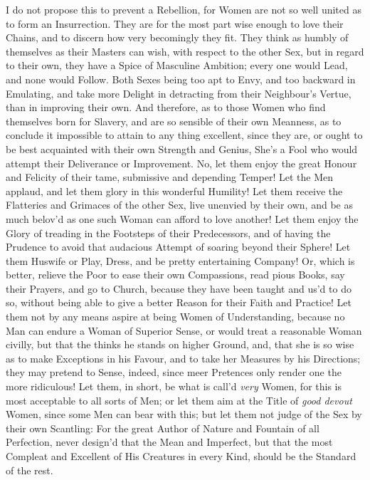 I do not propose this to prevent a Rebellion, for Women are not so
well united as to form an Insurrection. They are for the most part
wise enough to love their Chains, and to discern how very becomingly
they fit. They think as humbly of themselves as their Masters can
wish, with respect to the other Sex, but in regard to their own, they
have a Spice of Masculine Ambition; every one would Lead, and none
would Follow. Both Sexes being too apt to Envy, and too backward in
Emulating, and take more Delight in detracting from their
Neighbour's Vertue, than in improving their own. And therefore, as to
those Women who find themselves born for Slavery, and are so sensible
of their own  Meanness, as to conclude it impossible to
attain to any thing excellent, since they are, or ought to be best
acquainted with their own Strength and Genius, She's a Fool who would
attempt their Deliverance or Improvement. No, let them enjoy the great
Honour and Felicity of their tame, submissive and depending Temper!
Let the Men applaud, and let them glory in this wonderful Humility!
Let them receive the Flatteries and Grimaces of the other Sex, live
unenvied by their own, and be as much belov'd as one such Woman can
afford to love another! Let them enjoy the Glory of treading in the
Footsteps of their Predecessors, and of having the Prudence to avoid
that audacious Attempt of soaring beyond their Sphere! Let them
Huswife or Play, Dress, and be pretty entertaining Company! Or, which
is better, relieve the Poor to ease their own Compassions, read
pious Books, say their Prayers, and go to Church, because they have
been taught and us'd to do so,  without being able to give a
better Reason for their Faith and Practice! Let them not by any means
aspire at being Women of Understanding, because no Man can endure a
Woman of Superior Sense, or would treat a reasonable Woman civilly,
but that the thinks he stands on higher Ground, and, that she is so
wise as to make Exceptions in his Favour, and to take her Measures
by his Directions; they may pretend to Sense, indeed, since meer
Pretences only render one the more ridiculous! Let them, in short, be
what is call'd \textit{very} Women, for this is most acceptable to all
sorts of Men; or let them aim at the Title of \textit{good devout}
Women, since some Men can bear with this; but let them not judge of
the Sex by their own Scantling: For the great Author of Nature and
Fountain of all Perfection, never design'd that the Mean and
Imperfect, but that the most Compleat and Excellent of His Creatures
in every Kind, should be the Standard of the rest.


